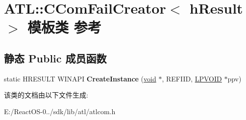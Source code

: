 \hypertarget{class_a_t_l_1_1_c_com_fail_creator}{}\section{A\+TL\+:\+:C\+Com\+Fail\+Creator$<$ h\+Result $>$ 模板类 参考}
\label{class_a_t_l_1_1_c_com_fail_creator}
\subsection*{静态 Public 成员函数}
\begin{DoxyCompactItemize}
\item 
\mbox{\label{class_a_t_l_1_1_c_com_fail_creator_a6d6b8b343f2c8c6ab5d2078e420baa44}} 
static H\+R\+E\+S\+U\+LT W\+I\+N\+A\+PI {\bfseries Create\+Instance} (\hyperlink{interfacevoid}{void} $\ast$, R\+E\+F\+I\+ID, \hyperlink{interfacevoid}{L\+P\+V\+O\+ID} $\ast$ppv)
\end{DoxyCompactItemize}


该类的文档由以下文件生成\+:\begin{DoxyCompactItemize}
\item 
E\+:/\+React\+O\+S-\/0../sdk/lib/atl/atlcom.\+h\end{DoxyCompactItemize}
